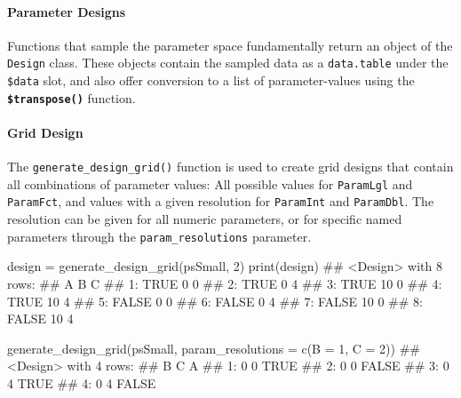 \documentclass[]{article}
\newenvironment{Shaded}{}{}
\newcommand{\DataTypeTok}[1]{#1}
\newcommand{\DecValTok}[1]{#1}
\newcommand{\KeywordTok}[1]{\textcolor[rgb]{0.00,0.00,1.00}{#1}}
\newcommand{\NormalTok}[1]{#1}
\newcommand{\StringTok}[1]{\textcolor[rgb]{0.00,0.50,0.50}{#1}}
\let\oldparagraph\paragraph
\renewcommand{\paragraph}[1]{\oldparagraph{#1}\mbox{}}
\renewenvironment{Shaded} {\begin{snugshade}\small} {\end{snugshade}}
\begin{document}
\hypertarget{parameter-designs}{%
\paragraph{Parameter Designs}\label{parameter-designs}}

Functions that sample the parameter space fundamentally return an object of the \texttt{Design} class.
These objects contain the sampled data as a \texttt{data.table} under the \texttt{\$data} slot, and also offer conversion to a list of parameter-values using the \textbf{\texttt{\$transpose()}} function.

\hypertarget{grid-design}{%
\paragraph{Grid Design}\label{grid-design}}

The \texttt{generate\_design\_grid()} function is used to create grid designs that contain all combinations of parameter values: All possible values for \texttt{ParamLgl} and \texttt{ParamFct}, and values with a given resolution for \texttt{ParamInt} and \texttt{ParamDbl}.
The resolution can be given for all numeric parameters, or for specific named parameters through the \texttt{param\_resolutions} parameter.

\begin{Shaded}
\begin{Highlighting}[]
\NormalTok{design =}\StringTok{ }\KeywordTok{generate_design_grid}\NormalTok{(psSmall, }\DecValTok{2}\NormalTok{)}
\KeywordTok{print}\NormalTok{(design)}
\NormalTok{## <Design> with 8 rows:}
\NormalTok{##        A  B C}
\NormalTok{## 1:  TRUE  0 0}
\NormalTok{## 2:  TRUE  0 4}
\NormalTok{## 3:  TRUE 10 0}
\NormalTok{## 4:  TRUE 10 4}
\NormalTok{## 5: FALSE  0 0}
\NormalTok{## 6: FALSE  0 4}
\NormalTok{## 7: FALSE 10 0}
\NormalTok{## 8: FALSE 10 4}
\end{Highlighting}
\end{Shaded}

\begin{Shaded}
\begin{Highlighting}[]
\KeywordTok{generate_design_grid}\NormalTok{(psSmall, }\DataTypeTok{param_resolutions =} \KeywordTok{c}\NormalTok{(}\DataTypeTok{B =} \DecValTok{1}\NormalTok{, }\DataTypeTok{C =} \DecValTok{2}\NormalTok{))}
\NormalTok{## <Design> with 4 rows:}
\NormalTok{##    B C     A}
\NormalTok{## 1: 0 0  TRUE}
\NormalTok{## 2: 0 0 FALSE}
\NormalTok{## 3: 0 4  TRUE}
\NormalTok{## 4: 0 4 FALSE}
\end{Highlighting}
\end{Shaded}
\end{document}
